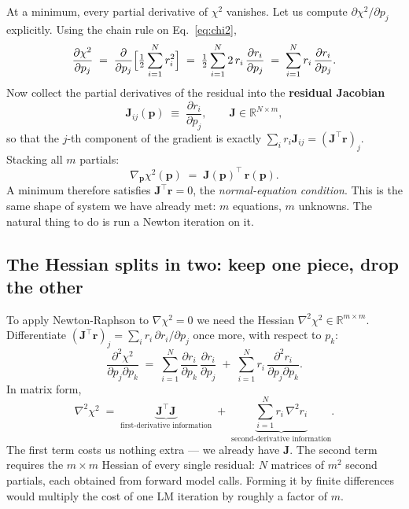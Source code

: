 \documentclass[11pt,a4paper]{article}
\newcommand{\R}{\mathbb{R}}
\newcommand{\Jac}{\mathbf{J}}
\newcommand{\pv}{\mathbf{p}}                          %
\newcommand{\rv}{\mathbf{r}}                          %
\begin{document}
At a minimum, every partial derivative of $\chi^2$ vanishes. Let us
compute $\partial\chi^2/\partial p_j$ explicitly. Using the chain
rule on Eq.~\eqref{eq:chi2},
\begin{equation}
   \frac{\partial \chi^2}{\partial p_j}
   \;=\; \frac{\partial}{\partial p_j}\Bigl[\tfrac{1}{2}\sum_{i=1}^{N} r_i^2\Bigr]
   \;=\; \tfrac{1}{2}\sum_{i=1}^{N} 2\,r_i\,\frac{\partial r_i}{\partial p_j}
   \;=\; \sum_{i=1}^{N} r_i\,\frac{\partial r_i}{\partial p_j}.
\end{equation}
Now collect the partial derivatives of the residual into the
\textbf{residual Jacobian}
\begin{equation}
   \Jac_{ij}(\pv) \;\equiv\; \frac{\partial r_i}{\partial p_j},
   \qquad \Jac \in \R^{N \times m},
\end{equation}
so that the $j$-th component of the gradient is exactly
$\sum_i r_i \Jac_{ij} = (\Jac^{\!\top}\rv)_j$. Stacking all $m$
partials:
\begin{equation}
   \boxed{\;
   \nabla_{\pv}\chi^2(\pv) \;=\; \Jac(\pv)^{\!\top}\,\rv(\pv).
   \;}
\end{equation}
A minimum therefore satisfies $\Jac^{\!\top}\rv = 0$, the
\emph{normal-equation condition}. This is the same shape of system
we have already met: $m$ equations, $m$ unknowns. The natural thing
to do is run a Newton iteration on it.

\subsection{The Hessian splits in two: keep one piece, drop the other}

To apply Newton-Raphson to $\nabla\chi^2 = 0$ we need the Hessian
$\nabla^2\chi^2 \in \R^{m\times m}$. Differentiate
$(\Jac^{\!\top}\rv)_j = \sum_i r_i\,\partial r_i/\partial p_j$ once
more, with respect to $p_k$:
\begin{equation}
   \frac{\partial^2 \chi^2}{\partial p_j \partial p_k}
   \;=\; \sum_{i=1}^{N}
        \frac{\partial r_i}{\partial p_k}\,\frac{\partial r_i}{\partial p_j}
        \;+\;
        \sum_{i=1}^{N} r_i\,\frac{\partial^2 r_i}{\partial p_j \partial p_k}.
\end{equation}
In matrix form,
\begin{equation}
   \nabla^2 \chi^2
   \;=\;
   \underbrace{\Jac^{\!\top}\Jac}_{\text{first-derivative information}}
   \;+\;
   \underbrace{\sum_{i=1}^{N} r_i\,\nabla^2 r_i}_{\text{second-derivative information}}.
   \label{eq:hessian-split}
\end{equation}
The first term costs us nothing extra --- we already have $\Jac$.
The second term requires the $m\times m$ Hessian of every single
residual: $N$ matrices of $m^2$ second partials, each obtained
from forward model calls. Forming it by finite differences would
multiply the cost of one LM iteration by roughly a factor of $m$.
\end{document}
